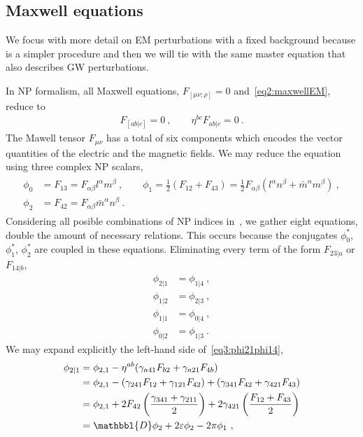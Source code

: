 \subsection{Maxwell equations}

We focus with more detail on EM perturbations with a fixed background because is a simpler procedure and then we will tie with the same master equation that also describes GW perturbations. 

In NP formalism, all Maxwell equations, $F_{[\mu\nu ; \rho]}=0$ and~\eqref{eq2:maxwellEM}, reduce to
\begin{align}
    F_{[ab \rvert c]} = 0 ~,\qquad \eta^{bc} F_{ab \rvert c} = 0 ~.
    \label{eq3:maxwellFabEqs}
\end{align}
The Mawell tensor $F_{\mu\nu}$ has a total of six components which encodes the vector quantities of the electric and the magnetic fields. We may reduce the equation using three complex NP scalars,
\begin{align}
    \begin{split}
        \phi_0 &= F_{13} = F_{\alpha\beta} l^\alpha m^\beta ~,\qquad
        \phi_1 = \tfrac{1}{2} (F_{12} + F_{43}) = \tfrac{1}{2} F_{\alpha\beta} (l^\alpha n^\beta + \bar{m}^\alpha m^\beta) ~,\\
        \phi_2 &= F_{42} = F_{\alpha\beta} \bar{m}^\alpha n^\beta ~.
    \end{split}
    \label{eq3:maxwellNPphi}
\end{align}
Considering all posible combinations of NP indices in~, we gather eight equations, double the amount of necessary relations. 
This occurs because the conjugates $\phi_0^*$, $\phi_1^*$, $\phi_2^*$ are coupled in these equations. Eliminating every term of the form $F_{23\rvert a}$ or $F_{14\rvert b}$, 
\begin{subequations}
    \begin{align}
        \phi_{2\rvert 1} &= \phi_{1\rvert 4} ~, \label{eq3:phi21phi14}\\
        \phi_{1\rvert 2} &= \phi_{2\rvert 3} ~, \label{eq3:phi12phi23}\\
        \phi_{1\rvert 1} &= \phi_{0\rvert 4} ~, \label{eq3:phi11phi04}\\
        \phi_{0\rvert 2} &= \phi_{1\rvert 3} ~. \label{eq3:phi02phi13}
    \end{align}
\end{subequations}
We may expand explicitly the left-hand side of~\eqref{eq3:phi21phi14},
\begin{align}
    \begin{split}
        \phi_{2\rvert 1} &= \phi_{2, 1} - \eta^{ab}( \gamma_{a41} F_{b2} + \gamma_{a21} F_{4b} ) \\
        &= \phi_{2, 1} - (\gamma_{241} F_{12} + \gamma_{121} F_{42}) + ( \gamma_{341} F_{42} + \gamma_{421} F_{43} ) \\
        &= \phi_{2, 1} + 2 F_{42} \left(\frac{\gamma_{341} + \gamma_{211}}{2}\right) + 2 \gamma_{421} \left(\frac{F_{12} + F_{43}}{2}\right) \\
        &= \mathbbl{D} \phi_2 + 2 \varepsilon \phi_2 - 2 \pi \phi_1 ~,
    \end{split}
    \label{eq3:phi21SpinCoef}
\end{align}

